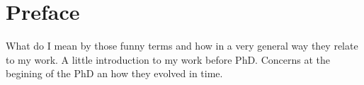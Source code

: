 \chapter{Preface}



What do I mean by those funny terms and how in a very general way they relate to my work. A little introduction to my work before PhD. Concerns at the begining of the PhD an how they evolved in time. 


\label{ch:intro}
